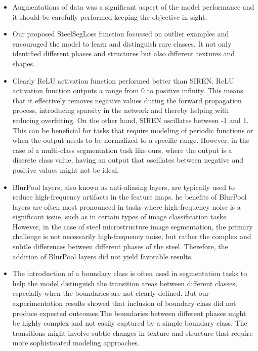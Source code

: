 \documentclass[]{article}
\begin{document}
\begin{itemize}
	\item Augmentations of data was a significant aspect of the model performance and it should be carefully performed keeping the objective in sight.
	\item Our proposed SteelSegLoss function focussed on outlier examples and encouraged the model to learn and distinguish rare classes. It not only identified different phases and structures but also different textures and shapes.
	\item Clearly ReLU activation function performed better than SIREN. ReLU activation function outputs a range from 0 to positive infinity. This means that it effectively removes negative values during the forward propagation process, introducing sparsity in the network and thereby helping with reducing overfitting. On the other hand, SIREN oscillates between -1 and 1. This can be beneficial for tasks that require modeling of periodic functions or when the output needs to be normalized to a specific range. However, in the case of a multi-class segmentation task like ours, where the output is a discrete class value, having an output that oscillates between negative and positive values might not be ideal. 
	\item BlurPool layers, also known as anti-aliasing layers, are typically used to reduce high-frequency artifacts in the feature maps. he benefits of BlurPool layers are often most pronounced in tasks where high-frequency noise is a significant issue, such as in certain types of image classification tasks. However, in the case of steel microstructure image segmentation, the primary challenge is not necessarily high-frequency noise, but rather the complex and subtle differences between different phases of the steel. Therefore, the addition of BlurPool layers did not yield favorable results.
	\item The introduction of a boundary class is often used in segmentation tasks to help the model distinguish the transition areas between different classes, especially when the boundaries are not clearly defined. But our experimentation results showed that inclusion of boundary class did not produce expected outcomes.The boundaries between different phases might be highly complex and not easily captured by a simple boundary class. The transitions might involve subtle changes in texture and structure that require more sophisticated modeling approaches.
\end{itemize}
 
\end{document}
